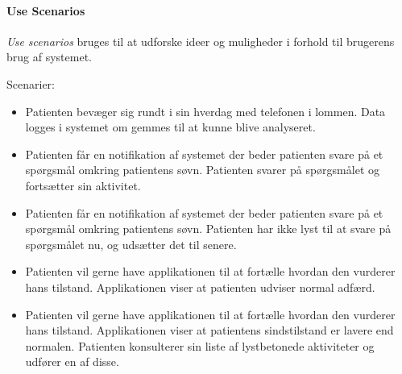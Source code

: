 \paragraph{Use Scenarios}
\textit{Use scenarios} bruges til at udforske ideer og muligheder i forhold til brugerens brug af systemet.

Scenarier:
\begin{itemize}
	\item Patienten bevæger sig rundt i sin hverdag med telefonen i lommen. 
	Data logges i systemet om gemmes til at kunne blive analyseret.
	\item Patienten får en notifikation af systemet der beder patienten svare på et spørgsmål omkring patientens søvn.
	Patienten svarer på spørgsmålet og fortsætter sin aktivitet.
	\item Patienten får en notifikation af systemet der beder patienten svare på et spørgsmål omkring patientens søvn.
	Patienten har ikke lyst til at svare på spørgsmålet nu, og udsætter det til senere.
	\item Patienten vil gerne have applikationen til at fortælle hvordan den vurderer hans tilstand.
	Applikationen viser at patienten udviser normal adfærd.
	\item Patienten vil gerne have applikationen til at fortælle hvordan den vurderer hans tilstand.
	Applikationen viser at patientens sindstilstand er lavere end normalen.
	Patienten konsulterer sin liste af lystbetonede aktiviteter og udfører en af disse.
\end{itemize}


